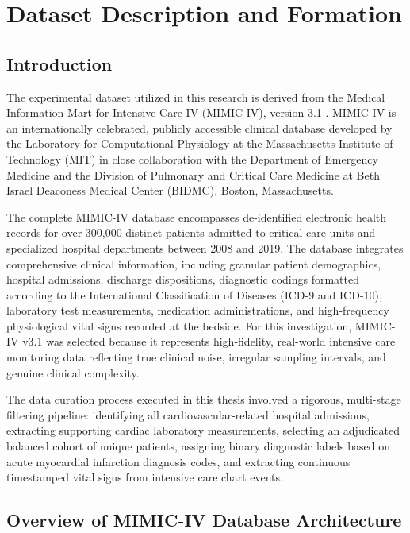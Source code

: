 \chapter{Dataset Description and Formation}
\label{ch:dataset}

\section{Introduction}
\label{sec:dataset_intro}

The experimental dataset utilized in this research is derived from the Medical Information Mart for Intensive Care IV (MIMIC-IV), version 3.1 \citep{johnson2023mimic}. MIMIC-IV is an internationally celebrated, publicly accessible clinical database developed by the Laboratory for Computational Physiology at the Massachusetts Institute of Technology (MIT) in close collaboration with the Department of Emergency Medicine and the Division of Pulmonary and Critical Care Medicine at Beth Israel Deaconess Medical Center (BIDMC), Boston, Massachusetts. 

The complete MIMIC-IV database encompasses de-identified electronic health records for over 300,000 distinct patients admitted to critical care units and specialized hospital departments between 2008 and 2019. The database integrates comprehensive clinical information, including granular patient demographics, hospital admissions, discharge dispositions, diagnostic codings formatted according to the International Classification of Diseases (ICD-9 and ICD-10), laboratory test measurements, medication administrations, and high-frequency physiological vital signs recorded at the bedside. For this investigation, MIMIC-IV v3.1 was selected because it represents high-fidelity, real-world intensive care monitoring data reflecting true clinical noise, irregular sampling intervals, and genuine clinical complexity.

The data curation process executed in this thesis involved a rigorous, multi-stage filtering pipeline: identifying all cardiovascular-related hospital admissions, extracting supporting cardiac laboratory measurements, selecting an adjudicated balanced cohort of unique patients, assigning binary diagnostic labels based on acute myocardial infarction diagnosis codes, and extracting continuous timestamped vital signs from intensive care chart events.

\section{Overview of MIMIC-IV Database Architecture}
\label{sec:mimic_overview}

